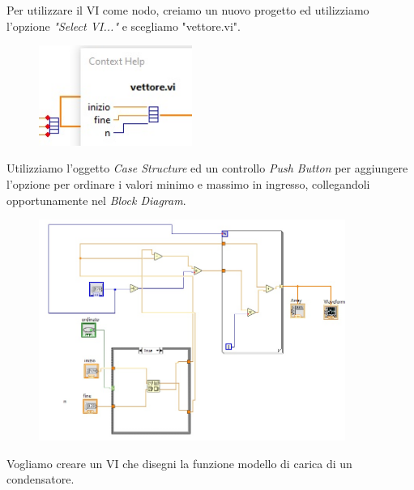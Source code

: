Per utilizzare il VI come nodo, creiamo un nuovo progetto ed utilizziamo l'opzione \textit{"Select VI..."} e scegliamo "vettore.vi".

\begin{figure}[H]
\caption{}
    \includegraphics[width=5cm]{settimana_1/immagini/vettore.jpg}
    \centering
\end{figure}

Utilizziamo l'oggetto \textit{Case Structure} ed un controllo \textit{Push Button} per aggiungere l'opzione per ordinare i valori minimo e massimo in ingresso, collegandoli opportunamente nel \textit{Block Diagram}.

\begin{figure}[H]
\caption{}
    \includegraphics[width=10cm]{settimana_1/immagini/case.jpg}
    \centering
\end{figure}

Vogliamo creare un VI che disegni la funzione modello di carica di un condensatore.

